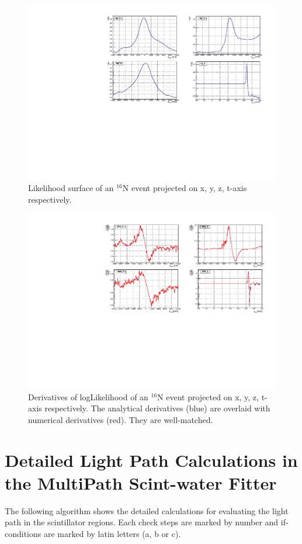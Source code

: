 \begin{figure}
	\centering
	\includegraphics[width=160mm]{logL_xyzt.pdf}
	\caption{Likelihood surface of an {$^{16}$}N event projected on x, y, z, t-axis respectively.}
	\label{logLxyz}
\end{figure}

\begin{figure}
	\centering
	\includegraphics[width=160mm]{derivativeLogL_xyzt.pdf}
	\caption{Derivatives of logLikelihood of an {$^{16}$}N event projected on x, y, z, t-axis respectively. The analytical derivatives (blue) are overlaid with numerical derivatives (red). They are well-matched.}
	\label{derivative_logLxyz}
\end{figure}



\section{Detailed Light Path Calculations in the MultiPath Scint-water Fitter}\label{sect:lightpath}
The following algorithm shows the detailed calculations for evaluating the light path in the scintillator regions. Each check steps are marked by number and if-conditions are marked by latin letters (a, b or c). 

